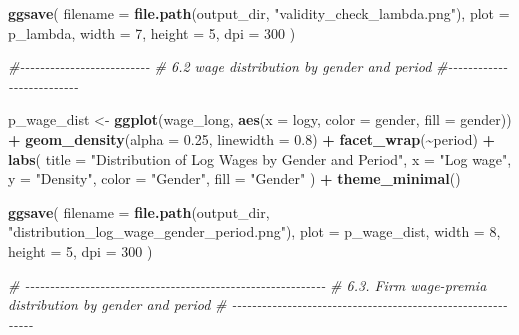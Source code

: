 \documentclass[
]{article}
\newenvironment{Shaded}{\begin{snugshade}}{\end{snugshade}}
\newcommand{\AttributeTok}[1]{\textcolor[rgb]{0.13,0.29,0.53}{#1}}
\newcommand{\CommentTok}[1]{\textcolor[rgb]{0.56,0.35,0.01}{\textit{#1}}}
\newcommand{\DecValTok}[1]{\textcolor[rgb]{0.00,0.00,0.81}{#1}}
\newcommand{\FloatTok}[1]{\textcolor[rgb]{0.00,0.00,0.81}{#1}}
\newcommand{\FunctionTok}[1]{\textcolor[rgb]{0.13,0.29,0.53}{\textbf{#1}}}
\newcommand{\NormalTok}[1]{#1}
\newcommand{\OtherTok}[1]{\textcolor[rgb]{0.56,0.35,0.01}{#1}}
\newcommand{\SpecialCharTok}[1]{\textcolor[rgb]{0.81,0.36,0.00}{\textbf{#1}}}
\newcommand{\StringTok}[1]{\textcolor[rgb]{0.31,0.60,0.02}{#1}}
\begin{document}
\begin{Shaded}
\begin{Highlighting}[]
\FunctionTok{ggsave}\NormalTok{(}
    \AttributeTok{filename =} \FunctionTok{file.path}\NormalTok{(output\_dir, }\StringTok{"validity\_check\_lambda.png"}\NormalTok{),}
    \AttributeTok{plot =}\NormalTok{ p\_lambda,}
    \AttributeTok{width =} \DecValTok{7}\NormalTok{,}
    \AttributeTok{height =} \DecValTok{5}\NormalTok{,}
    \AttributeTok{dpi =} \DecValTok{300}
\NormalTok{)}

\CommentTok{\#{-}{-}{-}{-}{-}{-}{-}{-}{-}{-}{-}{-}{-}{-}{-}{-}{-}{-}{-}{-}{-}{-}{-}{-}{-}{-}}
\CommentTok{\# 6.2 wage distribution by gender and period}
\CommentTok{\#{-}{-}{-}{-}{-}{-}{-}{-}{-}{-}{-}{-}{-}{-}{-}{-}{-}{-}{-}{-}{-}{-}{-}{-}{-}{-}}

\NormalTok{p\_wage\_dist }\OtherTok{\textless{}{-}} \FunctionTok{ggplot}\NormalTok{(wage\_long, }\FunctionTok{aes}\NormalTok{(}\AttributeTok{x =}\NormalTok{ logy, }\AttributeTok{color =}\NormalTok{ gender, }\AttributeTok{fill =}\NormalTok{ gender)) }\SpecialCharTok{+}
    \FunctionTok{geom\_density}\NormalTok{(}\AttributeTok{alpha =} \FloatTok{0.25}\NormalTok{, }\AttributeTok{linewidth =} \FloatTok{0.8}\NormalTok{) }\SpecialCharTok{+}
    \FunctionTok{facet\_wrap}\NormalTok{(}\SpecialCharTok{\textasciitilde{}}\NormalTok{period) }\SpecialCharTok{+}
    \FunctionTok{labs}\NormalTok{(}
        \AttributeTok{title =} \StringTok{"Distribution of Log Wages by Gender and Period"}\NormalTok{,}
        \AttributeTok{x =} \StringTok{"Log wage"}\NormalTok{,}
        \AttributeTok{y =} \StringTok{"Density"}\NormalTok{,}
        \AttributeTok{color =} \StringTok{"Gender"}\NormalTok{,}
        \AttributeTok{fill =} \StringTok{"Gender"}
\NormalTok{    ) }\SpecialCharTok{+}
    \FunctionTok{theme\_minimal}\NormalTok{()}

\FunctionTok{ggsave}\NormalTok{(}
    \AttributeTok{filename =} \FunctionTok{file.path}\NormalTok{(output\_dir, }\StringTok{"distribution\_log\_wage\_gender\_period.png"}\NormalTok{),}
    \AttributeTok{plot =}\NormalTok{ p\_wage\_dist,}
    \AttributeTok{width =} \DecValTok{8}\NormalTok{,}
    \AttributeTok{height =} \DecValTok{5}\NormalTok{,}
    \AttributeTok{dpi =} \DecValTok{300}
\NormalTok{)}

\CommentTok{\# {-}{-}{-}{-}{-}{-}{-}{-}{-}{-}{-}{-}{-}{-}{-}{-}{-}{-}{-}{-}{-}{-}{-}{-}{-}{-}{-}{-}{-}{-}{-}{-}{-}{-}{-}{-}{-}{-}{-}{-}{-}{-}{-}{-}{-}{-}{-}{-}{-}{-}{-}{-}{-}{-}{-}{-}{-}{-}{-}{-}}
\CommentTok{\# 6.3. Firm wage{-}premia distribution by gender and period}
\CommentTok{\# {-}{-}{-}{-}{-}{-}{-}{-}{-}{-}{-}{-}{-}{-}{-}{-}{-}{-}{-}{-}{-}{-}{-}{-}{-}{-}{-}{-}{-}{-}{-}{-}{-}{-}{-}{-}{-}{-}{-}{-}{-}{-}{-}{-}{-}{-}{-}{-}{-}{-}{-}{-}{-}{-}{-}{-}{-}{-}{-}{-}}


\end{Highlighting}
\end{Shaded}
\end{document}
